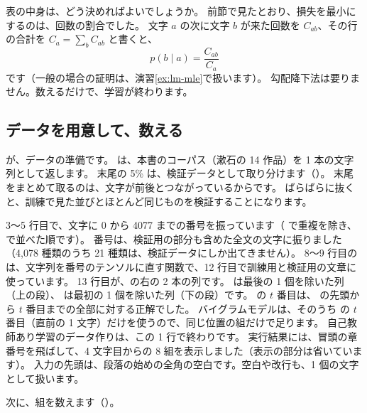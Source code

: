 表の中身は、どう決めればよいでしょうか。
前節で見たとおり、損失を最小にするのは、回数の割合でした。
文字 $a$ の次に文字 $b$ が来た回数を $C_{ab}$、その行の合計を $C_a=\sum_{b}C_{ab}$ と書くと、
\begin{equation}
p(b\mid a)=\frac{C_{ab}}{C_a}
\label{eq:lm-count}
\end{equation}
です（一般の場合の証明は、演習\ref{ex:lm-mle}で扱います）。
勾配降下法は要りません。数えるだけで、学習が終わります。

\subsection*{データを用意して、数える}

が、データの準備です。
 は、本書のコーパス（漱石の 14 作品）を 1 本の文字列として返します。
末尾の 5\% は、検証データとして取り分けます（）。
末尾をまとめて取るのは、文字が前後とつながっているからです。
ばらばらに抜くと、訓練で見た並びとほとんど同じものを検証することになります。

\par{} %

3〜5 行目で、文字に 0 から 4077 までの番号を振っています（ で重複を除き、 で並べた順です）。
番号は、検証用の部分も含めた全文の文字に振りました（4,078 種類のうち 21 種類は、検証データにしか出てきません）。
8〜9 行目の  は、文字列を番号のテンソルに直す関数で、12 行目で訓練用と検証用の文章に使っています。
13 行目が、の右の 2 本の列です。
 は最後の 1 個を除いた列（上の段）、 は最初の 1 個を除いた列（下の段）です。
 の $t$ 番目は、 の先頭から $t$ 番目までの全部に対する正解でした。
バイグラムモデルは、そのうち  の $t$ 番目（直前の 1 文字）だけを使うので、同じ位置の組だけで足ります。
自己教師あり学習のデータ作りは、この 1 行で終わりです。
実行結果には、冒頭の章番号を飛ばして、4 文字目からの 8 組を表示しました（表示の部分は省いています）。
入力の先頭は、段落の始めの全角の空白です。空白や改行も、1 個の文字として扱います。

次に、組を数えます（）。

\par{} %

